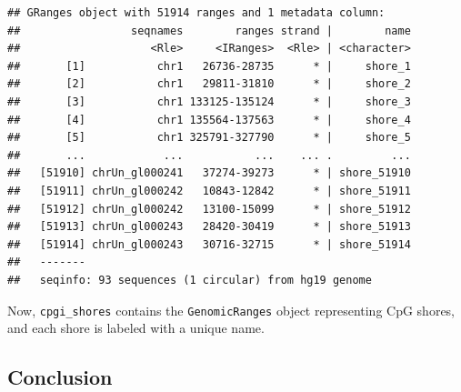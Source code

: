 \documentclass[
]{book}
\newenvironment{Shaded}{\begin{snugshade}}{\end{snugshade}}
\newcommand{\AttributeTok}[1]{\textcolor[rgb]{0.13,0.29,0.53}{#1}}
\newcommand{\CommentTok}[1]{\textcolor[rgb]{0.56,0.35,0.01}{\textit{#1}}}
\newcommand{\DecValTok}[1]{\textcolor[rgb]{0.00,0.00,0.81}{#1}}
\newcommand{\FunctionTok}[1]{\textcolor[rgb]{0.13,0.29,0.53}{\textbf{#1}}}
\newcommand{\NormalTok}[1]{#1}
\newcommand{\OtherTok}[1]{\textcolor[rgb]{0.56,0.35,0.01}{#1}}
\newcommand{\SpecialCharTok}[1]{\textcolor[rgb]{0.81,0.36,0.00}{\textbf{#1}}}
\newcommand{\StringTok}[1]{\textcolor[rgb]{0.31,0.60,0.02}{#1}}
\begin{document}
\begin{Shaded}
\end{Shaded}

\begin{verbatim}
## GRanges object with 51914 ranges and 1 metadata column:
##                 seqnames        ranges strand |        name
##                    <Rle>     <IRanges>  <Rle> | <character>
##       [1]           chr1   26736-28735      * |     shore_1
##       [2]           chr1   29811-31810      * |     shore_2
##       [3]           chr1 133125-135124      * |     shore_3
##       [4]           chr1 135564-137563      * |     shore_4
##       [5]           chr1 325791-327790      * |     shore_5
##       ...            ...           ...    ... .         ...
##   [51910] chrUn_gl000241   37274-39273      * | shore_51910
##   [51911] chrUn_gl000242   10843-12842      * | shore_51911
##   [51912] chrUn_gl000242   13100-15099      * | shore_51912
##   [51913] chrUn_gl000243   28420-30419      * | shore_51913
##   [51914] chrUn_gl000243   30716-32715      * | shore_51914
##   -------
##   seqinfo: 93 sequences (1 circular) from hg19 genome
\end{verbatim}

Now, \texttt{cpgi\_shores} contains the \texttt{GenomicRanges} object representing CpG shores, and each shore is labeled with a unique name.

\hypertarget{conclusion-28}{%
\subsection{Conclusion}\label{conclusion-28}}
\end{document}
